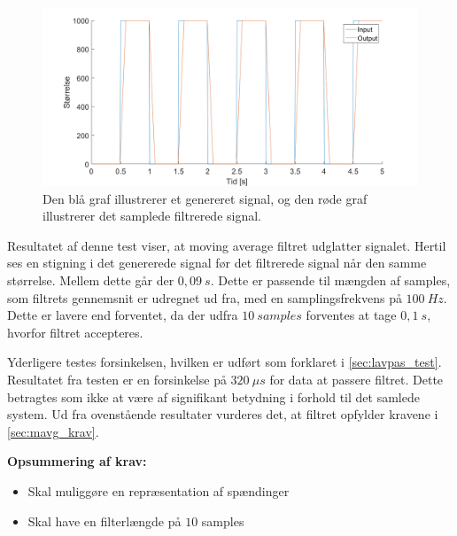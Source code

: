 \begin{figure}[H]
	\centering
	\includegraphics[width=1\textwidth]{figures/forsinkelse}
	\caption{Den blå graf illustrerer et genereret signal, og den røde graf illustrerer det samplede filtrerede signal.}
	\label{fig:forsinkelse}
\end{figure}

\noindent
Resultatet af denne test viser, at moving average filtret udglatter signalet. 
Hertil ses en stigning i det genererede signal før det filtrerede signal når den samme størrelse. 
Mellem dette går der $0,09~s$. 
Dette er passende til mængden af samples, som filtrets gennemsnit er udregnet ud fra, med en samplingsfrekvens på $100~Hz$. 
Dette er lavere end forventet, da der udfra $10~samples$ forventes at tage $0,1~s$, hvorfor filtret accepteres.  

Yderligere testes forsinkelsen, hvilken er udført som forklaret i \autoref{sec:lavpas_test}. 
Resultatet fra testen er en forsinkelse på $320~\mu s$ for data at passere filtret. 
Dette betragtes som ikke at være af signifikant betydning i forhold til det samlede system.    
Ud fra ovenstående resultater vurderes det, at filtret opfylder kravene i \autoref{sec:mavg_krav}. 

\vspace{3mm}
\textbf{Opsummering af krav:}
\begin{itemize}
\item[\text{\sffamily \checkmark}] Skal muliggøre en repræsentation af spændinger 
\item[\text{\sffamily \checkmark}] Skal have en filterlængde på $10$ samples
\end{itemize}